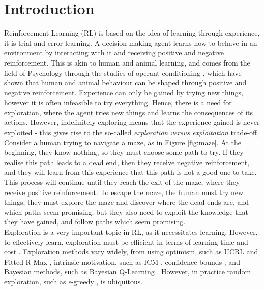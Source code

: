 
\chapter{Introduction}

\label{chapter1}

Reinforcement Learning (RL) \citep{Sutton1998} is based on the idea of learning through experience, it is trial-and-error learning. A decision-making agent learns how to behave in an environment by interacting with it and receiving positive and negative reinforcement. This is akin to human and animal learning, and comes from the field of Psychology through the studies of operant conditioning \citep{nla.cat-vn2770732}, which have shown that human and animal behaviour can be shaped through positive and negative reinforcement. Experience can only be gained by trying new things, however it is often infeasible to try everything. Hence, there is a need for exploration, where the agent tries new things and learns the consequences of its actions. However, indefinitely exploring means that the experience gained is never exploited - this gives rise to the so-called \textit{exploration versus exploitation} trade-off.
\\Consider a human trying to navigate a maze, as in Figure \ref{fig:maze}. At the beginning, they know nothing, so they must choose some path to try. If they realise this path leads to a dead end, then they receive negative reinforcement, and they will learn from this experience that this path is not a good one to take. This process will continue until they reach the exit of the maze, where they receive positive reinforcement. To escape the maze, the human must try new things; they must explore the maze and discover where the dead ends are, and which paths seem promising, but they also need to exploit the knowledge that they have gained, and follow paths which seem promising.
\\Exploration is a very important topic in RL, as it necessitates learning. However, to effectively learn, exploration must be efficient in terms of learning time and cost \cite{Thrun-1992-15850}.
Exploration methods vary widely, from using optimism, such as UCRL \cite{NIPS2006_c1b70d96} and Fitted R-Max \cite{SARA07-jong}, intrinsic motivation, such as ICM \cite{DBLP:journals/corr/PathakAED17}, confidence bounds \cite{10.5555/911176}, and Bayesian methods, such as Bayesian Q-Learning \cite{10.5555/944919.944941}. However, in practice random exploration, such as $\epsilon$-greedy \cite{Watkins:1989, conf/nips/Sutton95}, is ubiquitous.
